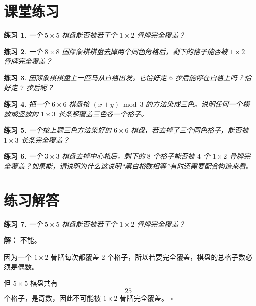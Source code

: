 \documentclass[11pt,a4paper,fontset=fandol]{ctexart}
\theoremstyle{formaltheorem}
\theoremstyle{formalexample}
\newtheorem{exercise}{练习}[section]
\newenvironment{solution}{\par\noindent\textbf{解：}}{\hfill$\square$\par}
\begin{document}
\section{课堂练习}

\begin{exercise}
一个 $5\times 5$ 棋盘能否被若干个 $1\times 2$ 骨牌完全覆盖？
\end{exercise}

\begin{exercise}
一个 $8\times 8$ 国际象棋棋盘去掉两个同色角格后，剩下的格子能否被 $1\times 2$ 骨牌完全覆盖？
\end{exercise}

\begin{exercise}
国际象棋棋盘上一匹马从白格出发。它恰好走 $6$ 步后能停在白格上吗？恰好走 $7$ 步后呢？
\end{exercise}

\begin{exercise}
把一个 $6\times 6$ 棋盘按 $(x+y)\bmod 3$ 的方法染成三色。说明任何一个横放或竖放的 $1\times 3$ 长条都覆盖三色各一个格子。
\end{exercise}

\begin{exercise}
一个按上题三色方法染好的 $6\times 6$ 棋盘，若去掉了三个同色格子，能否被 $1\times 3$ 长条完全覆盖？
\end{exercise}

\begin{exercise}
一个 $3\times 3$ 棋盘去掉中心格后，剩下的 $8$ 个格子能否被 $4$ 个 $1\times 2$ 骨牌完全覆盖？如果能，请说明为什么这说明“黑白格数相等”有时还需要配合构造来看。
\end{exercise}

\newpage
\appendix
\section{练习解答}

\begin{exercise}
一个 $5\times 5$ 棋盘能否被若干个 $1\times 2$ 骨牌完全覆盖？
\end{exercise}

\begin{solution}
不能。

因为一个 $1\times 2$ 骨牌每次都覆盖 $2$ 个格子，所以若要完全覆盖，棋盘的总格子数必须是偶数。

但 $5\times 5$ 棋盘共有
\[
25
\]
个格子，是奇数，因此不可能被 $1\times 2$ 骨牌完全覆盖。
\end{solution}
\end{document}
